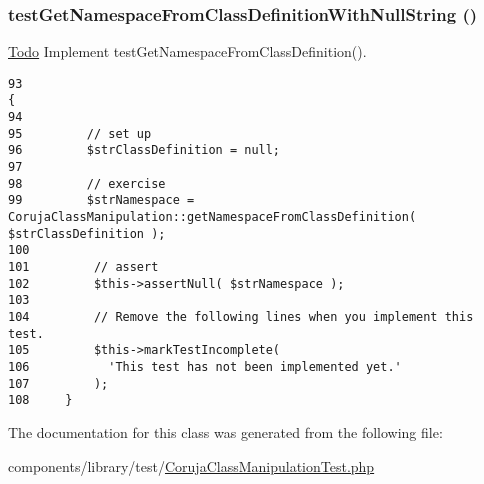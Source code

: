 \hypertarget{class_coruja_class_manipulation_test_e7c02c14ae225332ea595bb2b5466ad8}{
\subsubsection[{testGetNamespaceFromClassDefinitionWithNullString}]{\setlength{\rightskip}{0pt plus 5cm}testGetNamespaceFromClassDefinitionWithNullString ()}}
\label{class_coruja_class_manipulation_test_e7c02c14ae225332ea595bb2b5466ad8}


\begin{Desc}
\item[\hyperlink{todo__todo000008}{Todo}]Implement testGetNamespaceFromClassDefinition(). \end{Desc}


\begin{Code}\begin{verbatim}93                                                                         {
94 
95         // set up
96         $strClassDefinition = null;
97 
98         // exercise
99         $strNamespace = CorujaClassManipulation::getNamespaceFromClassDefinition( $strClassDefinition );
100 
101         // assert
102         $this->assertNull( $strNamespace );
103 
104         // Remove the following lines when you implement this test.
105         $this->markTestIncomplete(
106           'This test has not been implemented yet.'
107         );
108     }
\end{verbatim}
\end{Code}




The documentation for this class was generated from the following file:\begin{CompactItemize}
\item 
components/library/test/\hyperlink{_coruja_class_manipulation_test_8php}{CorujaClassManipulationTest.php}\end{CompactItemize}
